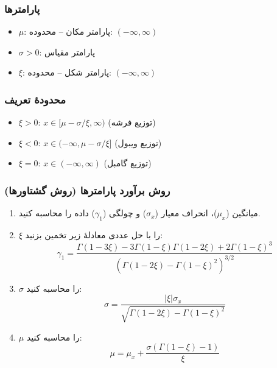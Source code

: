 \documentclass[a4paper,12pt]{article}
\begin{document}
\subsubsection{پارامترها}

\begin{itemize}
\item $\mu$: پارامتر مکان – محدوده: $(-\infty, \infty)$
\item $\sigma > 0$: پارامتر مقیاس
\item $\xi$: پارامتر شکل – محدوده: $(-\infty, \infty)$
\end{itemize}

\subsubsection{محدودهٔ تعریف}

\begin{itemize}
\item $\xi > 0$: $x \in [\mu - \sigma/\xi, \infty)$ (توزیع فرشه)
\item $\xi < 0$: $x \in (-\infty, \mu - \sigma/\xi]$ (توزیع ویبول)
\item $\xi = 0$: $x \in (-\infty, \infty)$ (توزیع گامبل)
\end{itemize}

\subsubsection{روش برآورد پارامترها (روش گشتاورها)}

\begin{enumerate}
\item میانگین ($\mu_x$)، انحراف معیار ($\sigma_x$) و چولگی ($\gamma_1$) داده را محاسبه کنید.
\item $\xi$ را با حل عددی معادلهٔ زیر تخمین بزنید:
\begin{equation}
\gamma_1 = \frac{\Gamma(1-3\xi) - 3\Gamma(1-\xi)\Gamma(1-2\xi) + 2\Gamma(1-\xi)^3}{(\Gamma(1-2\xi) - \Gamma(1-\xi)^2)^{3/2}}
\end{equation}
\item $\sigma$ را محاسبه کنید:
\begin{equation}
\sigma = \frac{|\xi|\sigma_x}{\sqrt{\Gamma(1-2\xi) - \Gamma(1-\xi)^2}}
\end{equation}
\item $\mu$ را محاسبه کنید:
\begin{equation}
\mu = \mu_x + \frac{\sigma(\Gamma(1-\xi)-1)}{\xi}
\end{equation}
\end{enumerate}
\end{document}
